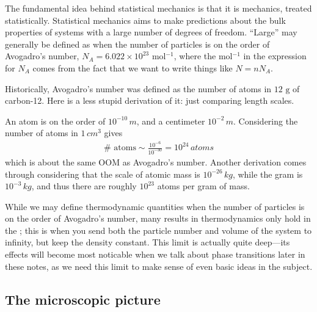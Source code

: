 \documentclass[11pt]{article}
\begin{document}
The fundamental idea behind statistical mechanics is that it is
mechanics, treated statistically. Statistical mechanics aims to make 
predictions about the bulk properties of systems with a large number of 
degrees of freedom. ``Large'' may generally be defined as
when the number of particles is on the order of Avogadro's number,
$N_A = 6.022 \times 10^{23}$ mol$^{-1}$, where the mol$^{-1}$ in the 
expression for $N_A$ comes from the fact that we want to write things 
like $N = n N_A$.

\begin{reemark}
    Historically, Avogadro's number was defined as the number of atoms 
    in $12 \text{ g}$ of carbon-12. Here is a less stupid derivation of it: 
    just comparing length scales.

    An atom is on the order of $10^{-10} \, \unit{m}$, and a centimeter $10^{-2} \, \unit{m}$.
    Considering the number of atoms in $1 \, \unit{cm}^3$ gives
    \begin{align*}
        \# \text{ atoms} \sim \frac{10^{-6}}{10^{-30}} = 10^{24} \, \unit{atoms}
    \end{align*}
    which is about the same OOM as Avogadro's number. Another derivation
    comes through considering that the scale of atomic mass is $10^{-26} \, \unit{kg}$,
    while the gram is $10^{-3} \, \unit{kg}$, and thus there are roughly
    $10^{23}$ atoms per gram of mass.
\end{reemark}

While we may define thermodynamic quantities when
the number of particles is on the order of Avogadro's number, many results 
in thermodynamics only hold in the ; this is when you 
send both the particle number and volume of the system to infinity, but keep the density
constant. This limit is actually quite deep---its effects will become most noticable 
when we talk about phase transitions later in these notes, as we need this limit
to make sense of even basic ideas in the subject.

\subsection{The microscopic picture}


\end{document}
